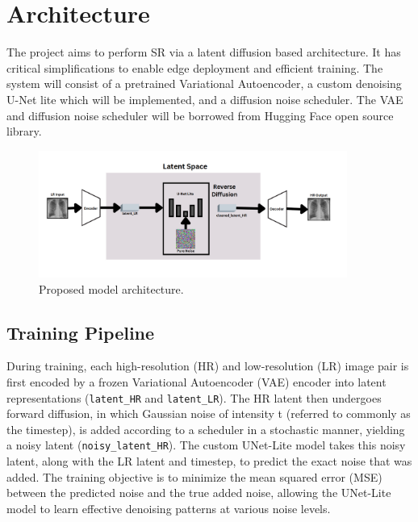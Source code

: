 \documentclass{article} %
\begin{document}
\section{Architecture}

The project aims to perform SR via a latent diffusion based architecture. It has critical simplifications to enable edge deployment and efficient training. The system will consist of a pretrained Variational Autoencoder, a custom denoising U-Net lite which will be implemented, and a diffusion noise scheduler. The VAE and diffusion noise scheduler will be borrowed from Hugging Face open source library.

\begin{figure}[h]
\begin{center}
\includegraphics[width=0.9\textwidth]{Figs/model.png}
\end{center}
\caption{Proposed model architecture.}
\end{figure}

\subsection{Training Pipeline}

During training, each high-resolution (HR) and low-resolution (LR) image pair is first encoded by a frozen Variational Autoencoder (VAE) encoder into latent representations (\texttt{latent\_HR} and \texttt{latent\_LR}). The HR latent then undergoes forward diffusion, in which Gaussian noise of intensity t (referred to commonly as the timestep), is added according to a scheduler in a stochastic manner, yielding a noisy latent (\texttt{noisy\_latent\_HR}). The custom UNet-Lite model takes this noisy latent, along with the LR latent and timestep, to predict the exact noise that was added. The training objective is to minimize the mean squared error (MSE) between the predicted noise and the true added noise, allowing the UNet-Lite model to learn effective denoising patterns at various noise levels.
\end{document}
